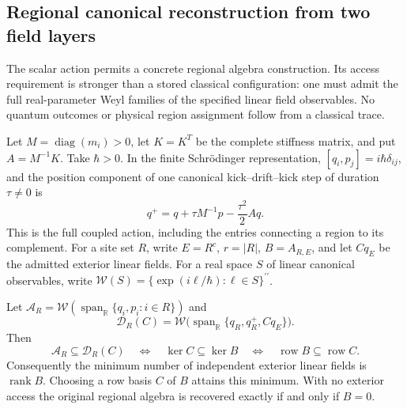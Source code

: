 \subsection{Regional canonical reconstruction from two field layers}
\label{sec:source-scalar-regional-time-slice}

The scalar action permits a concrete regional algebra construction. Its
access requirement is stronger than a stored classical configuration:
one must admit the full real-parameter Weyl families of the specified
linear field observables. No quantum outcomes or physical region assignment
follow from a classical trace.

Let $M=\operatorname{diag}(m_i)>0$, let $K=K^T$ be the complete stiffness
matrix, and put $A=M^{-1}K$. Take $\hbar>0$. In the finite Schr\"odinger representation,
$[q_i,p_j]=i\hbar\delta_{ij}$, and the position component of one canonical
kick--drift--kick step of duration $\tau\ne0$ is
\[
 q^+=q+\tau M^{-1}p-\frac{\tau^2}{2}Aq.
\]
This is the full coupled action, including the entries connecting a region
to its complement. For a site set $R$, write $E=R^c$, $r=|R|$,
$B=A_{R,E}$, and let $Cq_E$ be the admitted exterior linear fields.
For a real space $S$ of linear canonical observables, write
$\mathcal W(S)=\{\exp(i\ell/\hbar):\ell\in S\}^{\prime\prime}$.

\begin{theorem}
\label{thm:source-scalar-regional-collar}
Let $\mathcal A_R=\mathcal W(\operatorname{span}_{\mathbb R}\{q_i,p_i:i\in R\})$
and
\[
 \mathcal D_R(C)=\mathcal W\bigl(
    \operatorname{span}_{\mathbb R}\{q_R,q_R^+,Cq_E\}\bigr).
\]
Then
\[
 \mathcal A_R\subseteq\mathcal D_R(C)
 \quad\Longleftrightarrow\quad
 \ker C\subseteq\ker B
 \quad\Longleftrightarrow\quad
 \operatorname{row}B\subseteq\operatorname{row}C.
\]
Consequently the minimum number of independent exterior linear fields is
$\operatorname{rank}B$. Choosing a row basis $C$ of $B$ attains this minimum.
With no exterior access the original regional algebra is recovered exactly
if and only if $B=0$.
\end{theorem}

